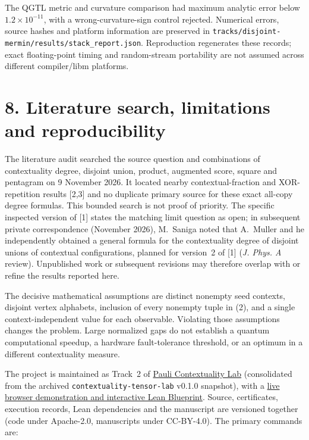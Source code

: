 \documentclass[10pt,a4paper]{article}
\begin{document}
The QGTL metric and curvature comparison had maximum analytic error below \(1.2\times10^{-11}\), with a wrong-curvature-sign control rejected. Numerical errors, source hashes and platform information are preserved in \texttt{tracks/disjoint-mermin/results/stack\_report.json}. Reproduction regenerates these records; exact floating-point timing and random-stream portability are not assumed across different compiler/libm platforms.

\section{8. Literature search, limitations and reproducibility}\label{literature-search-limitations-and-reproducibility}

The literature audit searched the source question and combinations of contextuality degree, disjoint union, product, augmented score, square and pentagram on 9 November 2026. It located nearby contextual-fraction and XOR-repetition results {[}2,3{]} and no duplicate primary source for these exact all-copy degree formulas. This bounded search is not proof of priority. The specific inspected version of {[}1{]} states the matching limit question as open; in subsequent private correspondence (November 2026), M.~Saniga noted that A.~Muller and he independently obtained a general formula for the contextuality degree of disjoint unions of contextual configurations, planned for version~2 of {[}1{]} (\emph{J. Phys. A} review). Unpublished work or subsequent revisions may therefore overlap with or refine the results reported here.

The decisive mathematical assumptions are distinct nonempty seed contexts, disjoint vertex alphabets, inclusion of every nonempty tuple in (2), and a single context-independent value for each observable. Violating those assumptions changes the problem. Large normalized gaps do not establish a quantum computational speedup, a hardware fault-tolerance threshold, or an optimum in a different contextuality measure.

The project is maintained as Track~2 of \href{https://github.com/0thernes/pauli-contextuality-lab}{Pauli Contextuality Lab} (consolidated from the archived \texttt{contextuality-tensor-lab} v0.1.0 snapshot), with a \href{https://0thernes.github.io/pauli-contextuality-lab/}{live browser demonstration and interactive Lean Blueprint}. Source, certificates, execution records, Lean dependencies and the manuscript are versioned together (code under Apache-2.0, manuscripts under CC-BY-4.0). The primary commands are:
\end{document}
